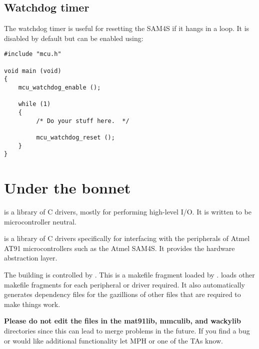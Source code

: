 \subsection{Watchdog timer}
\label{watchdog-timer}

The watchdog timer is useful for resetting the SAM4S if it hangs in a
loop.  It is disabled by default but can be enabled using:
%
\begin{verbatim}
#include "mcu.h"

void main (void)
{
    mcu_watchdog_enable ();
   
    while (1)
    {
         /* Do your stuff here.  */

         mcu_watchdog_reset ();
    }
}
\end{verbatim}

\section{Under the bonnet}
\label{under-the-bonnet}

 is a library of C drivers, mostly for performing high-level I/O.
It is written to be microcontroller neutral.

 is a library of C drivers specifically for interfacing
with the peripherals of Atmel AT91 microcontrollers such as the Atmel
SAM4S. It provides the hardware abstraction layer.

The building is controlled by . This is a
makefile fragment loaded by .
 loads other makefile fragments for each
peripheral or driver required. It also automatically generates
dependency files for the gazillions of other files that are required to
make things work.


\textbf{Please do not edit the files in the mat91lib, mmculib, and
wackylib} directories since this can lead to merge problems in the
future. If you find a bug or would like additional functionality let MPH
or one of the TAs know.

